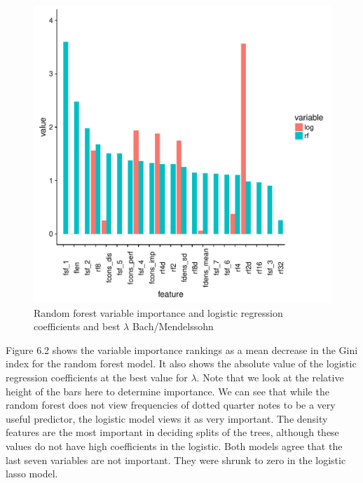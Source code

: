 \documentclass[12pt,twoside]{reedthesis}
\theoremstyle{definition}
\theoremstyle{definition}
\theoremstyle{definition}
\theoremstyle{remark}
\begin{document}
\begin{figure}[H]
\centering
\includegraphics[scale = .5]{images/var_imp_rflog_f.pdf}
\caption{Random forest variable importance and logistic regression coefficients and best $\lambda$ Bach/Mendelssohn}
\label{subd}
\end{figure}
Figure 6.2 shows the variable importance rankings as a mean decrease in
the Gini index for the random forest model. It also shows the absolute
value of the logistic regression coefficients at the best value for
\(\lambda\). Note that we look at the relative height of the bars here
to determine importance. We can see that while the random forest does
not view frequencies of dotted quarter notes to be a very useful
predictor, the logistic model views it as very important. The density
features are the most important in deciding splits of the trees,
although these values do not have high coefficients in the logistic.
Both models agree that the last seven variables are not important. They
were shrunk to zero in the logistic lasso model.
\end{document}

